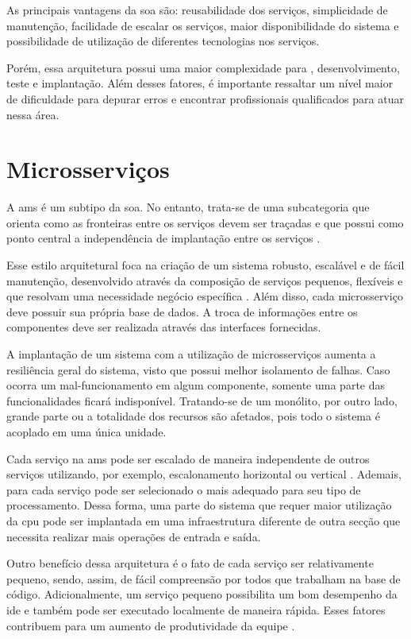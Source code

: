 As principais vantagens da \acrshort{soa} são: reusabilidade dos serviços, simplicidade de manutenção, facilidade de escalar os serviços, maior disponibilidade do sistema e possibilidade de utilização de diferentes tecnologias nos serviços.

Porém, essa arquitetura possui uma maior complexidade para , desenvolvimento, teste e implantação. Além desses fatores, é importante ressaltar um nível maior de dificuldade para depurar erros e encontrar profissionais qualificados para atuar nessa área.

\section{Microsserviços} 
A \acrfull{ams} é um subtipo da \acrshort{soa}. No entanto, trata-se de uma subcategoria que orienta como as fronteiras entre os serviços devem ser traçadas e que possui como ponto central a independência de implantação entre os serviços \cite{buildingMicroservices}.

Esse estilo arquitetural foca na criação de um sistema robusto, escalável e de fácil manutenção, desenvolvido através da composição de serviços pequenos, flexíveis e que resolvam uma necessidade negócio específica \cite{buildingMicroservices}. Além disso, cada microsserviço deve possuir sua própria base de dados. A troca de informações entre os componentes deve ser realizada através das interfaces fornecidas.

A implantação de um sistema com a utilização de microsserviços aumenta a resiliência geral do sistema, visto que possui melhor isolamento de falhas. Caso ocorra um mal-funcionamento em algum componente, somente uma parte das funcionalidades ficará indisponível. Tratando-se de um monólito, por outro lado, grande parte ou a totalidade dos recursos são afetados, pois todo o sistema é acoplado em uma única unidade.

Cada serviço na \acrshort{ams} pode ser escalado de maneira independente de outros serviços utilizando, por exemplo, escalonamento horizontal ou vertical \cite{richardson2018microservices}. Ademais, para cada serviço pode ser selecionado o  mais adequado para seu tipo de processamento. Dessa forma, uma parte do sistema que requer maior utilização da \acrshort{cpu} pode ser implantada em uma infraestrutura diferente de outra secção que necessita realizar mais operações de entrada e saída.

Outro benefício dessa arquitetura é o fato de cada serviço ser relativamente pequeno, sendo, assim, de fácil compreensão por todos que trabalham na base de código. Adicionalmente, um serviço pequeno possibilita um bom desempenho da \acrshort{ide} e também pode ser executado localmente de maneira rápida. Esses fatores contribuem para um aumento de produtividade da equipe \cite{richardson2018microservices}.

